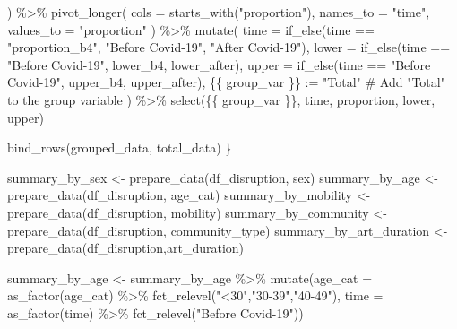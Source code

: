 \documentclass[
  letterpaper,
  DIV=11,
  numbers=noendperiod]{scrartcl}
\newenvironment{Shaded}{\begin{snugshade}}{\end{snugshade}}
\newcommand{\AttributeTok}[1]{\textcolor[rgb]{0.40,0.45,0.13}{#1}}
\newcommand{\CommentTok}[1]{\textcolor[rgb]{0.37,0.37,0.37}{#1}}
\newcommand{\ErrorTok}[1]{\textcolor[rgb]{0.68,0.00,0.00}{#1}}
\newcommand{\FunctionTok}[1]{\textcolor[rgb]{0.28,0.35,0.67}{#1}}
\newcommand{\NormalTok}[1]{\textcolor[rgb]{0.00,0.23,0.31}{#1}}
\newcommand{\OtherTok}[1]{\textcolor[rgb]{0.00,0.23,0.31}{#1}}
\newcommand{\SpecialCharTok}[1]{\textcolor[rgb]{0.37,0.37,0.37}{#1}}
\newcommand{\StringTok}[1]{\textcolor[rgb]{0.13,0.47,0.30}{#1}}
\begin{document}
\begin{Shaded}
\begin{Highlighting}[]
\NormalTok{    ) }\SpecialCharTok{\%\textgreater{}\%}
    \FunctionTok{pivot\_longer}\NormalTok{(}
      \AttributeTok{cols =} \FunctionTok{starts\_with}\NormalTok{(}\StringTok{"proportion"}\NormalTok{),}
      \AttributeTok{names\_to =} \StringTok{"time"}\NormalTok{,}
      \AttributeTok{values\_to =} \StringTok{"proportion"}
\NormalTok{    ) }\SpecialCharTok{\%\textgreater{}\%}
    \FunctionTok{mutate}\NormalTok{(}
      \AttributeTok{time =} \FunctionTok{if\_else}\NormalTok{(time }\SpecialCharTok{==} \StringTok{"proportion\_b4"}\NormalTok{, }\StringTok{"Before Covid{-}19"}\NormalTok{, }\StringTok{"After Covid{-}19"}\NormalTok{),}
      \AttributeTok{lower =} \FunctionTok{if\_else}\NormalTok{(time }\SpecialCharTok{==} \StringTok{"Before Covid{-}19"}\NormalTok{, lower\_b4, lower\_after),}
      \AttributeTok{upper =} \FunctionTok{if\_else}\NormalTok{(time }\SpecialCharTok{==} \StringTok{"Before Covid{-}19"}\NormalTok{, upper\_b4, upper\_after),}
\NormalTok{      \{\{ group\_var \}\} }\SpecialCharTok{:}\ErrorTok{=} \StringTok{"Total"} \CommentTok{\# Add "Total" to the group variable}
\NormalTok{    ) }\SpecialCharTok{\%\textgreater{}\%}
    \FunctionTok{select}\NormalTok{(\{\{ group\_var \}\}, time, proportion, lower, upper)}

  \FunctionTok{bind\_rows}\NormalTok{(grouped\_data, total\_data)}
\NormalTok{\}}
\end{Highlighting}
\end{Shaded}

\begin{Shaded}
\begin{Highlighting}[]
\NormalTok{summary\_by\_sex }\OtherTok{\textless{}{-}} \FunctionTok{prepare\_data}\NormalTok{(df\_disruption, sex)}
\NormalTok{summary\_by\_age }\OtherTok{\textless{}{-}} \FunctionTok{prepare\_data}\NormalTok{(df\_disruption, age\_cat)}
\NormalTok{summary\_by\_mobility }\OtherTok{\textless{}{-}} \FunctionTok{prepare\_data}\NormalTok{(df\_disruption, mobility)}
\NormalTok{summary\_by\_community }\OtherTok{\textless{}{-}} \FunctionTok{prepare\_data}\NormalTok{(df\_disruption, community\_type)}
\NormalTok{summary\_by\_art\_duration }\OtherTok{\textless{}{-}} \FunctionTok{prepare\_data}\NormalTok{(df\_disruption,art\_duration)}
\end{Highlighting}
\end{Shaded}

\begin{Shaded}
\begin{Highlighting}[]
\NormalTok{summary\_by\_age }\OtherTok{\textless{}{-}}\NormalTok{  summary\_by\_age }\SpecialCharTok{\%\textgreater{}\%} 
  \FunctionTok{mutate}\NormalTok{(}\AttributeTok{age\_cat =} \FunctionTok{as\_factor}\NormalTok{(age\_cat) }\SpecialCharTok{\%\textgreater{}\%} 
           \FunctionTok{fct\_relevel}\NormalTok{(}\StringTok{"\textless{}30"}\NormalTok{,}\StringTok{"30{-}39"}\NormalTok{,}\StringTok{"40{-}49"}\NormalTok{),}
         \AttributeTok{time =} \FunctionTok{as\_factor}\NormalTok{(time) }\SpecialCharTok{\%\textgreater{}\%} 
           \FunctionTok{fct\_relevel}\NormalTok{(}\StringTok{"Before Covid{-}19"}\NormalTok{))}
\end{Highlighting}
\end{Shaded}
\end{document}
